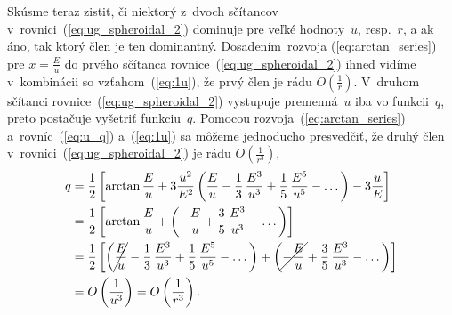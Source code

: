 \documentclass[a4paper,12pt]{book}
\begin{document}
Skúsme teraz zistiť, či niektorý z~dvoch sčítancov 
v~rovnici~(\ref{eq:ug_spheroidal_2}) dominuje pre veľké hodnoty~$u$, resp.~$r$,  
a ak áno, tak ktorý člen je ten dominantný.  Dosadením~rozvoja 
(\ref{eq:arctan_series}) pre $x = \frac{E}{u}$ do prvého sčítanca 
rovnice~(\ref{eq:ug_spheroidal_2}) ihneď vidíme v~kombinácii so 
vzťahom~(\ref{eq:1u}), že prvý člen je rádu $O\left( \frac{1}{r} \right)$.  
V~druhom sčítanci rovnice~(\ref{eq:ug_spheroidal_2}) vystupuje premenná~$u$ iba 
vo funkcii~$q$, preto postačuje vyšetriť funkciu~$q$.  Pomocou 
rozvoja~(\ref{eq:arctan_series}) a~rovníc~(\ref{eq:u_q}) a~(\ref{eq:1u}) sa 
môžeme jednoducho presvedčiť, že druhý člen 
v~rovnici~(\ref{eq:ug_spheroidal_2}) je rádu $O\left( \frac{1}{r^3} \right)$,
%
\begin{equation}
\begin{split}
q &= \frac{1}{2} \left[ \arctan\frac{E}{u} + 3\frac{u^2}{E^2} \left( 
\frac{E}{u} - \frac{1}{3} \, \frac{E^3}{u^3} + \frac{1}{5} \, \frac{E^5}{u^5} 
- \dots
\right) - 3\frac{u}{E} \right]\\
%
&= \frac{1}{2} \left[ \arctan\frac{E}{u} + \left( - \frac{E}{u} + \frac{3}{5} 
\, \frac{E^3}{u^3} - \dots \right) \right]\\
%
&= \frac{1}{2} \left[ \left(\cancel{\frac{E}{u}} - \frac{1}{3} \, 
\frac{E^3}{u^3} + \frac{1}{5} \, \frac{E^5}{u^5} - \dots \right) + \left( 
\cancel{- \frac{E}{u}} + \frac{3}{5} \, \frac{E^3}{u^3} - \dots \right) 
\right]\\
%
&=O\left( \frac{1}{u^3} \right) = O\left( \frac{1}{r^3} \right){.}
\end{split}
\end{equation}
\end{document}
